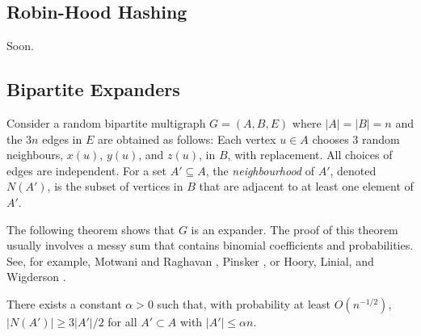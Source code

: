 \documentclass{patmorin}
\begin{document}
\subsection{Robin-Hood Hashing}

Soon.


\subsection{Bipartite Expanders}

Consider a random bipartite multigraph $G=(A,B,E)$ where $|A|=|B|=n$
and the $3n$ edges in $E$ are obtained as follows:  Each vertex $u\in A$
chooses 3 random neighbours, $x(u)$, $y(u)$, and $z(u)$, in $B$, with
replacement.  All choices of edges are independent. For a set $A'\subseteq
A$, the \emph{neighbourhood} of $A'$, denoted $N(A')$, is the subset of
vertices in $B$ that are adjacent to at least one element of $A'$.

The following theorem shows that $G$ is an expander.  The proof of
this theorem usually involves a messy sum that contains binomial
coefficients and probabilities.  See, for example, Motwani and
Raghavan \cite[Theorem~5.3]{motwani.raghavan:randomized}, Pinsker
\cite[Lemma 1]{pinsker:on}, or Hoory, Linial, and Wigderson
\cite[Lemma~1.9]{hoory.linial.ea:expander}.

\begin{thm}
  There exists a constant $\alpha >0$ such that, with probability at
  least $O(n^{-1/2})$, $|N(A')| \ge 3|A'|/2$ for all $A'\subset A$
  with $|A'|\le \alpha n$.
\end{thm}
\end{document}
